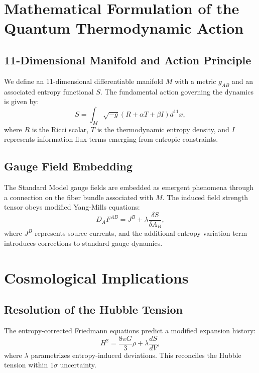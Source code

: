 \documentclass[12pt]{article}
\begin{document}
\section{Mathematical Formulation of the Quantum Thermodynamic Action}
\subsection{11-Dimensional Manifold and Action Principle}
We define an 11-dimensional differentiable manifold $M$ with a metric $g_{AB}$ and an associated entropy functional $S$. The fundamental action governing the dynamics is given by:
\begin{equation}
S = \int_M \sqrt{-g} \left(R + \alpha T + \beta I\right) d^{11}x,
\end{equation}
where $R$ is the Ricci scalar, $T$ is the thermodynamic entropy density, and $I$ represents information flux terms emerging from entropic constraints.

\subsection{Gauge Field Embedding}
The Standard Model gauge fields are embedded as emergent phenomena through a connection on the fiber bundle associated with $M$. The induced field strength tensor obeys modified Yang-Mills equations:
\begin{equation}
D_A F^{AB} = J^B + \lambda \frac{\delta S}{\delta A_B},
\end{equation}
where $J^B$ represents source currents, and the additional entropy variation term introduces corrections to standard gauge dynamics.

\section{Cosmological Implications}
\subsection{Resolution of the Hubble Tension}
The entropy-corrected Friedmann equations predict a modified expansion history:
\begin{equation}
H^2 = \frac{8\pi G}{3} \rho + \lambda \frac{dS}{dV},
\end{equation}
where $\lambda$ parametrizes entropy-induced deviations. This reconciles the Hubble tension within $1\sigma$ uncertainty.
\end{document}
